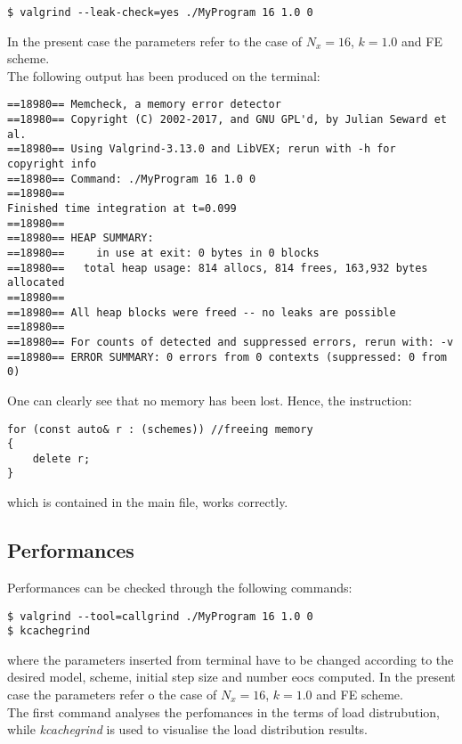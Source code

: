 \documentclass[11pt]{article}
\theoremstyle{theorem}
\theoremstyle{definition}
\begin{document}
\begin{lstlisting}
$ valgrind --leak-check=yes ./MyProgram 16 1.0 0
\end{lstlisting}

In the present case the parameters refer to the case of $N_x=16$, $k=1.0$ and FE scheme.\\

The following output has been produced on the terminal:

\begin{verbatim}
==18980== Memcheck, a memory error detector
==18980== Copyright (C) 2002-2017, and GNU GPL'd, by Julian Seward et al.
==18980== Using Valgrind-3.13.0 and LibVEX; rerun with -h for copyright info
==18980== Command: ./MyProgram 16 1.0 0
==18980==
Finished time integration at t=0.099
==18980==
==18980== HEAP SUMMARY:
==18980==     in use at exit: 0 bytes in 0 blocks
==18980==   total heap usage: 814 allocs, 814 frees, 163,932 bytes allocated
==18980==
==18980== All heap blocks were freed -- no leaks are possible
==18980==
==18980== For counts of detected and suppressed errors, rerun with: -v
==18980== ERROR SUMMARY: 0 errors from 0 contexts (suppressed: 0 from 0)
\end{verbatim}

One can clearly see that no memory has been lost. Hence, the instruction:

\begin{lstlisting}
for (const auto& r : (schemes)) //freeing memory
{
	delete r;
}
\end{lstlisting}

which is contained in the main file, works correctly.\\

\subsection{Performances}
\label{subsec:perf}
Performances can be checked through the following commands:
\begin{verbatim}
$ valgrind --tool=callgrind ./MyProgram 16 1.0 0
$ kcachegrind
\end{verbatim}

where the parameters inserted from terminal have to be changed according to the desired model, scheme, initial step size and number eocs computed. In the present case the parameters refer o the case of $N_x=16$, $k=1.0$ and FE scheme.\\
The first command analyses the perfomances in the terms of load distrubution, while \emph{kcachegrind} is used to visualise the load distribution results.\\
\end{document}
